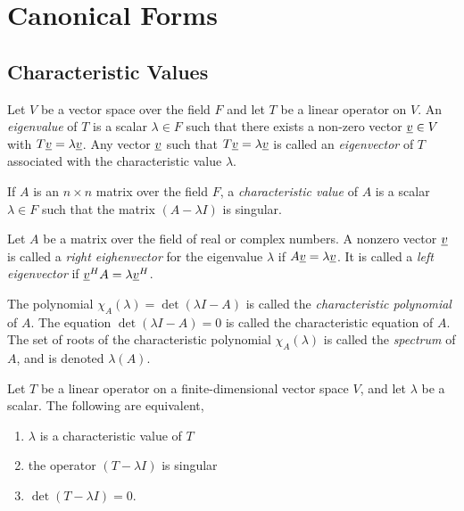 \chapter{Canonical Forms}

\section{Characteristic Values}

\begin{definition}
Let $V$ be a vector space over the field $F$ and let $T$ be a linear operator on $V$.
An \emph{eigenvalue} of $T$ is a scalar $\lambda \in F$ such that there exists a non-zero vector $\underline{v} \in V$ with $T \underline{v} = \lambda \underline{v}$.
Any vector $\underline{v}$ such that $T \underline{v} = \lambda \underline{v}$ is called an \emph{eigenvector} of $T$ associated with the characteristic value $\lambda$.
\end{definition}

\begin{definition}
If $A$ is an $n \times n$ matrix over the field $F$, a \emph{characteristic value} of $A$ is a scalar $\lambda \in F$ such that the matrix $(A - \lambda I)$ is singular.
\end{definition}

Let $A$ be a matrix over the field of real or complex numbers.
A nonzero vector $\underline{v}$ is called a \emph{right eighenvector} for the eigenvalue $\lambda$ if $A \underline{v} = \lambda \underline{v}$.
It is called a \emph{left eigenvector} if $\underline{v}^H A = \lambda \underline{v}^H$.

The polynomial $\chi_A (\lambda) = \det (\lambda I - A)$ is called the \emph{characteristic polynomial} of $A$.
The equation $\det (\lambda I - A) = 0$ is called the characteristic equation of $A$.
The set of roots of the characteristic polynomial $\chi_A (\lambda)$ is called the \emph{spectrum} of $A$, and is denoted $\lambda(A)$.

\begin{fact}
Let $T$ be a linear operator on a finite-dimensional vector space $V$, and let $\lambda$ be a scalar.
The following are equivalent,
\begin{enumerate}
\item $\lambda$ is a characteristic value of $T$
\item the operator $(T - \lambda I)$ is singular
\item $\det (T - \lambda I) = 0$.
\end{enumerate}
\end{fact}

